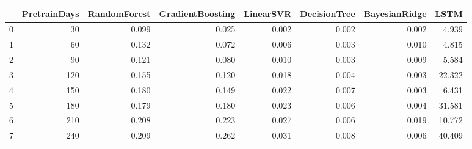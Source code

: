 \begin{tabular}{lrrrrrrr}
\toprule
{} &  PretrainDays &  RandomForest &  GradientBoosting &  LinearSVR &  DecisionTree &  BayesianRidge &   LSTM \\
\midrule
0 &            30 &         0.099 &             0.025 &      0.002 &         0.002 &          0.002 &  4.939 \\
1 &            60 &         0.132 &             0.072 &      0.006 &         0.003 &          0.010 &  4.815 \\
2 &            90 &         0.121 &             0.080 &      0.010 &         0.003 &          0.009 &  5.584 \\
3 &           120 &         0.155 &             0.120 &      0.018 &         0.004 &          0.003 & 22.322 \\
4 &           150 &         0.180 &             0.149 &      0.022 &         0.007 &          0.003 &  6.431 \\
5 &           180 &         0.179 &             0.180 &      0.023 &         0.006 &          0.004 & 31.581 \\
6 &           210 &         0.208 &             0.223 &      0.027 &         0.006 &          0.019 & 10.772 \\
7 &           240 &         0.209 &             0.262 &      0.031 &         0.008 &          0.006 & 40.409 \\
\bottomrule
\end{tabular}
